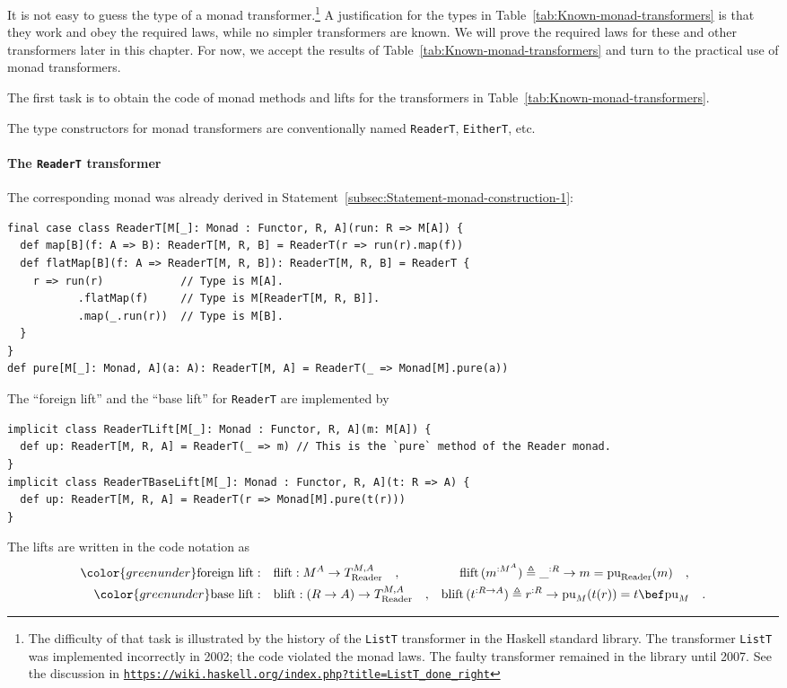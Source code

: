 It is not easy to guess the type of a monad transformer.\footnote{The difficulty of that task is illustrated by the history of the \lstinline!ListT!
transformer in the Haskell standard library. The transformer \lstinline!ListT!
was implemented incorrectly in 2002; the code violated the monad laws.
The faulty transformer remained in the library until 2007. See the
discussion in \texttt{\href{https://wiki.haskell.org/index.php?title=ListT_done_right}{https://wiki.haskell.org/index.php?title=ListT\_done\_right}}} A justification for the types in Table~\ref{tab:Known-monad-transformers}
is that they work and obey the required laws, while no simpler transformers
are known. We will prove the required laws for these and other transformers
later in this chapter. For now, we accept the results of Table~\ref{tab:Known-monad-transformers}
and turn to the practical use of monad transformers. 

The first task is to obtain the code of monad methods and lifts for
the transformers in Table~\ref{tab:Known-monad-transformers}.

The type constructors for monad transformers are conventionally named
\lstinline!ReaderT!, \lstinline!EitherT!, etc. 

\paragraph{The \texttt{ReaderT} transformer}

The corresponding monad was already derived in Statement~\ref{subsec:Statement-monad-construction-1}:
\begin{lstlisting}
final case class ReaderT[M[_]: Monad : Functor, R, A](run: R => M[A]) {
  def map[B](f: A => B): ReaderT[M, R, B] = ReaderT(r => run(r).map(f))
  def flatMap[B](f: A => ReaderT[M, R, B]): ReaderT[M, R, B] = ReaderT {
    r => run(r)            // Type is M[A].
           .flatMap(f)     // Type is M[ReaderT[M, R, B]].
           .map(_.run(r))  // Type is M[B].
  }
}
def pure[M[_]: Monad, A](a: A): ReaderT[M, A] = ReaderT(_ => Monad[M].pure(a))
\end{lstlisting}
The \textsf{``}foreign lift\textsf{''} and the \textsf{``}base lift\textsf{''} for \lstinline!ReaderT!
are implemented by
\begin{lstlisting}
implicit class ReaderTLift[M[_]: Monad : Functor, R, A](m: M[A]) {
  def up: ReaderT[M, R, A] = ReaderT(_ => m) // This is the `pure` method of the Reader monad.
}
implicit class ReaderTBaseLift[M[_]: Monad : Functor, R, A](t: R => A) {
  def up: ReaderT[M, R, A] = ReaderT(r => Monad[M].pure(t(r)))
}
\end{lstlisting}
The lifts are written in the code notation as
\begin{align*}
{\color{greenunder}\text{foreign lift}:}\quad & \text{flift}:M^{A}\rightarrow T_{\text{Reader}}^{M,A}\quad, & \text{flift}\,(m^{:M^{A}})\triangleq\_^{:R}\rightarrow m=\text{pu}_{\text{Reader}}(m)\quad,\quad~\\
{\color{greenunder}\text{base lift}:}\quad & \text{blift}:(R\rightarrow A)\rightarrow T_{\text{Reader}}^{M,A}\quad, & \text{blift}\,(t^{:R\rightarrow A})\triangleq r^{:R}\rightarrow\text{pu}_{M}(t(r))=t\bef\text{pu}_{M}\quad.
\end{align*}

